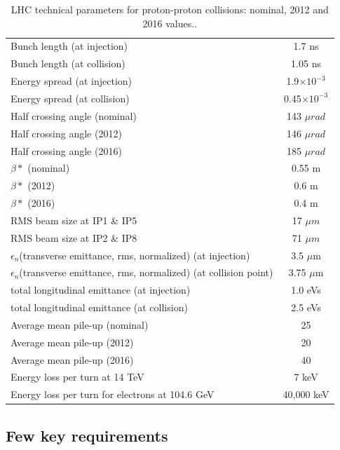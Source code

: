 \begin{table}
\begin{tabular}[!htbp]{l c}
Bunch length (at injection)   &   1.7 ns \\
Bunch length (at collision)   &   1.05 ns \\
Energy spread (at injection)   &   1.9$\times 10^{-3}$ \\
Energy spread (at collision)   &   0.45$\times 10^{-3}$  \\
\hline
Half crossing angle  (nominal)   & 143 $\mu rad$ \\
Half crossing angle  (2012)   & 146 $\mu rad$ \\
Half crossing angle  (2016)   & 185 $\mu rad$ \\
\hline
$\beta *$  (nominal) &   0.55 m\\
$\beta *$   (2012)&   0.6 m\\
$\beta *$   (2016)&   0.4 m\\
\hline
RMS beam size at IP1 \& IP5 &   17 $\mu m$ \\
RMS beam size at IP2 \& IP8 &   71 $\mu m$ \\
\hline
$\epsilon_n$(transverse emittance, rms, normalized) (at injection) &   3.5 $\mu$m\\
$\epsilon_n$(transverse emittance, rms, normalized) (at collision point) &   3.75 $\mu$m\\
\hline
total longitudinal emittance (at injection) & 1.0 eVs \\
total longitudinal emittance (at collision) & 2.5 eVs \\
\hline
Average mean pile-up (nominal) &   25 \\
Average mean pile-up (2012) &    20 \\
Average mean pile-up (2016) &    40 \\
\hline
Energy loss per turn at 14 TeV              &   7 keV   \\
Energy loss per turn for electrons at 104.6 GeV          &  40,000 keV     \\
\end{tabular}
\caption{LHC technical parameters for proton-proton collisions: nominal, 2012 and 2016 values.\cite{Bruce2016, Schoerner-Sadenius2015, LHC-parameters-2016, LHC-tdr-vol1}.}
\label{table:LHC-parameters}
\end{table}

\subsection{Few key requirements} %
\label{sub:few_key_requirements}

